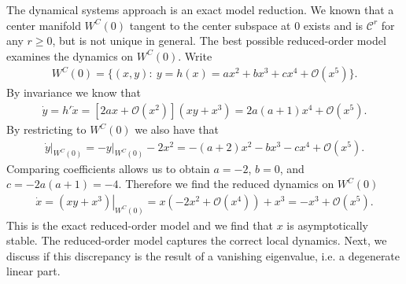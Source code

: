 \begin{ex}[]
	The dynamical systems approach is an exact model reduction. We known that a center manifold $W^{C}(0)$ tangent to the center subspace at $0 $ exists and is $\mathcal{C}^{r} $ for any $r\geq 0 $, but is not unique in general. The best possible reduced-order model examines the dynamics on $W^{C}(0) $. Write
	\begin{align}
		W^{C}(0) = \{(x,y):\ y = h(x) = ax^2 + bx^3 + cx^4 + \mathcal{O}(x^5) \}.
	\end{align}
By invariance we know that
 \begin{align}
 \dot{y} = h' \dot{x} = \left[ 2 a x + \mathcal{O}(x^{2}) \right] \left( xy + x^{3}\right) = 2a(a+1)x^{4} + \mathcal{O}(x^{5}).
\end{align}
By restricting to $W^{C}(0)$ we also have that
\begin{align}
	\left.\dot{y} \right|_{W^{C}(0)} = \left.-y\right|_{W^{C}(0)} - 2x^2 = -(a+2)x^{2} - bx^3 - cx^4 + \mathcal{O}(x^{5}).
\end{align}
Comparing coefficients allows us to obtain $a=-2$, $b=0$, and $c=-2a(a+1)=-4$. Therefore we find the reduced dynamics on $W^{C}(0)$ 
\begin{align}
	\dot{x} = \left.(xy+x^3)\right|_{W^{C}(0)} = x(-2x^2 + \mathcal{O}(x^4) ) + x^3	= -x^3 + \mathcal{O}(x^5).
\end{align}
This is the exact reduced-order model and we find that $x$ is asymptotically stable. The reduced-order model captures the correct local dynamics. Next, we discuss if this discrepancy is the result of a vanishing eigenvalue, i.e. a degenerate linear part.
\end{ex}

